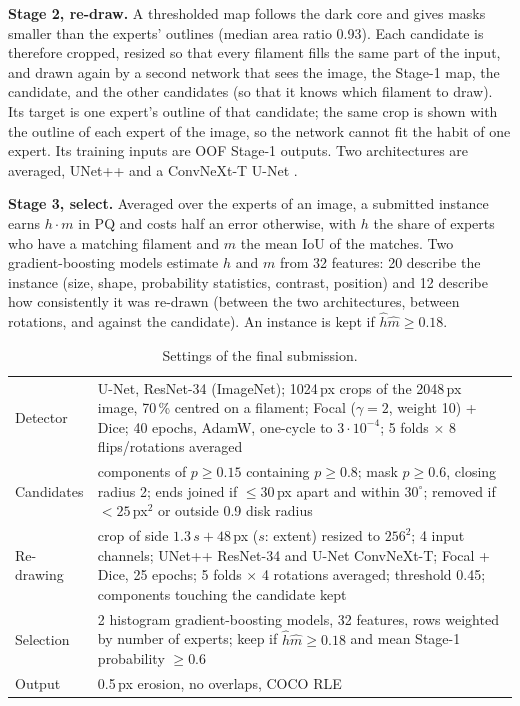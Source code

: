 \documentclass[sigconf]{acmart}
\begin{document}
        \textbf{Stage 2, re-draw.}
        A thresholded map follows the dark core and gives masks smaller than the experts' outlines (median area ratio 0.93). Each candidate is therefore cropped, resized so that every filament fills the same part of the input, and drawn again by a second network that sees the image, the Stage-1 map, the candidate, and the other candidates (so that it knows which filament to draw).
        Its target is one expert's outline of that candidate; the same crop is shown with the outline of each expert of the image, so the network cannot fit the habit of one expert. Its training inputs are OOF Stage-1 outputs.
        Two architectures are averaged, UNet++ \cite{zhou2018unetpp} and a ConvNeXt-T U-Net \cite{liu2022convnext}.

        \textbf{Stage 3, select.}
        Averaged over the experts of an image, a submitted instance earns $h\cdot m$ in PQ and costs half an error otherwise, with $h$ the share of experts who have a matching filament and $m$ the mean IoU of the matches. Two gradient-boosting models estimate $h$ and $m$ from 32 features: 20 describe the instance (size, shape, probability statistics, contrast, position) and 12 describe how consistently it was re-drawn (between the two architectures, between rotations, and against the candidate). An instance is kept if $\hat h\hat m\ge0.18$.

    \begin{table}[t]
        \caption{Settings of the final submission.}
        \label{tab:settings}
        \small
        \begin{tabularx}{\columnwidth}{@{}lX@{}}
            \toprule
            Detector & U-Net, ResNet-34 (ImageNet); 1024\,px crops of the 2048\,px image, 70\,\% centred on a filament; Focal ($\gamma=2$, weight 10) + Dice; 40 epochs, AdamW, one-cycle to $3\cdot10^{-4}$; 5 folds $\times$ 8 flips/rotations averaged \\
            Candidates & components of $p\ge0.15$ containing $p\ge0.8$; mask $p\ge0.6$, closing radius 2; ends joined if $\le30$\,px apart and within $30^\circ$; removed if $<25$\,px$^2$ or outside 0.9 disk radius \\
            Re-drawing & crop of side $1.3\,s+48$\,px ($s$: extent) resized to $256^2$; 4 input channels; UNet++ ResNet-34 and U-Net ConvNeXt-T; Focal + Dice, 25 epochs; 5 folds $\times$ 4 rotations averaged; threshold 0.45; components touching the candidate kept \\
            Selection & 2 histogram gradient-boosting models, 32 features, rows weighted by number of experts; keep if $\hat h\hat m\ge0.18$ and mean Stage-1 probability $\ge0.6$ \\
            Output & 0.5\,px erosion, no overlaps, COCO RLE \\
            \bottomrule
        \end{tabularx}
    \end{table}
\end{document}
